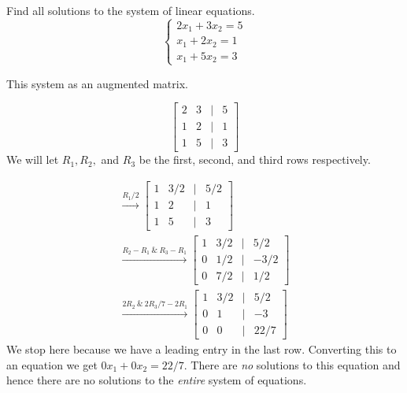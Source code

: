 \begin{example}
    Find all solutions to the system of linear equations.
    \[\begin{cases}
        2x_1 + 3x_2 = 5\\
        x_1 + 2x_2 = 1 \\
        x_1+5x_2=3
    \end{cases}\]
    \begin{solution}

        This system as an augmented matrix.

        \[\begin{bmatrix}
            2 & 3 & \vert & 5 \\
            1 & 2 & \vert & 1 \\
            1 & 5 & \vert & 3
        \end{bmatrix}\]
        We will let \(R_1, R_2,\) and \(R_3\) be the first, second, and third rows respectively.

        \begin{gather*}\overset{R_1/2}{\longrightarrow} \begin{bmatrix}
            1 & 3/2 & \vert & 5/2 \\
            1 & 2 & \vert & 1 \\
            1 & 5 & \vert & 3
        \end{bmatrix} \\
        \overset{R_2-R_1 \ \& \ R_3-R_1}{\longrightarrow} \begin{bmatrix}
            1 & 3/2 & \vert & 5/2 \\
            0 & 1/2 &  \vert & -3/2 \\
            0 & 7/2 &  \vert & 1/2
        \end{bmatrix}\\
        \overset{2R_2 \ \& \ 2R_3/7-2R_1}{\longrightarrow} \begin{bmatrix}
            1 & 3/2 & \vert & 5/2 \\
            0 & 1 &  \vert & -3 \\
            0 & 0 &  \vert & 22/7
        \end{bmatrix}
        \end{gather*}
        We stop here because we have a leading entry in the last row. Converting this to an equation we get \(0x_1+0x_2 = 22/7.\) There are \emph{no} solutions to this equation and hence there are no solutions to the \emph{entire} system of equations.
    \end{solution}
\end{example}
